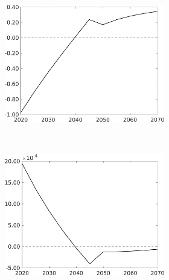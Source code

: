 \begin{figure}[h!!!]
\vspace{3mm}
	\begin{subfigure}{1\textwidth}
	\caption{\textbf{Deviation only optimal carbon tax from carbon-tax-only policy in percent}}
	\vspace{3mm}
	\begin{subfigure}{0.4\textwidth}
		\includegraphics[width=1\textwidth]{../../codding_model/own_basedOnFried/optimalPol_010922_revision/figures/all_13Sept22_Tplus30/CountTAUF_CTOPer_Opt_target_sgsff_nsk0_xgr0_knspil0_regime4_spillover0_sep0_extern0_PV1_etaa0.79.png}
	\end{subfigure}
	\begin{minipage}[]{0.1\textwidth}
		\
	\end{minipage}
	\begin{subfigure}{0.4\textwidth}
		\includegraphics[width=1\textwidth]{../../codding_model/own_basedOnFried/optimalPol_010922_revision/figures/all_13Sept22_Tplus30/CountTAUF_CTOPer_Opt_target_Hagg_nsk0_xgr0_knspil0_regime4_spillover0_sep0_extern0_PV1_etaa0.79.png}
	\end{subfigure}
\end{subfigure}


\end{figure}

